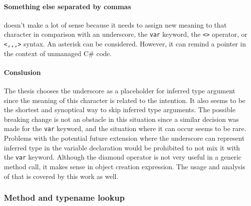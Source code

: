 \paragraph*{Something else separated by commas} doesn't make a lot of sense because it needs to assign new meaning to that character in comparison with an underscore, the \texttt{var} keyword, the \texttt{<>} operator, or \texttt{<,,,>} syntax. 
An asterisk can be considered.
However, it can remind a pointer in the context of unmanaged C\# code.

\paragraph*{Conslusion} The thesis chooses the underscore as a placeholder for inferred
type argument since the meaning of this character is related to the intention. 
It also seems to be the shortest and synoptical way to skip inferred type arguments. 
The possible breaking change is not an obstacle in this situation since a similar decision was made for the \texttt{var} keyword, and the situation where it can occur seems to be rare. 
Problems with the potential future extension where the underscore can represent inferred type in the variable declaration would be prohibited to not mix it with the \texttt{var} keyword. 
Although the diamond operator is not very useful in a generic method call, it makes sense in object creation expression. 
The usage and analysis of that is covered by this work as well.

\subsubsection{Method and typename lookup}

